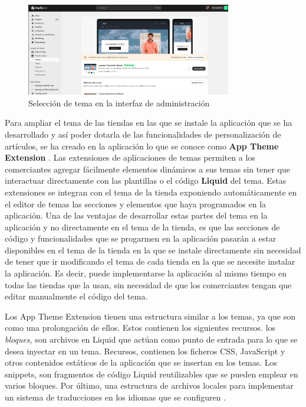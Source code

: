 \documentclass[12pt]{article}
\begin{document}
\begin{figure}[ht]
    \centering
    \includegraphics[width=0.8\textwidth]{imagenes/Interfaz de adminsitración elección de tema.png}
    \caption{\label{fig:2}Selección de tema en la interfaz de administración}
    \vspace{\fill}
\end{figure}

Para ampliar el tema de las tiendas en las que se instale la aplicación que se ha desarrollado y así poder dotarla de las funcionalidades de personalización de 
artículos, se ha creado en la aplicación lo que se conoce como \textbf{App Theme Extension} \cite{theme-app-extension}. Las extensiones de aplicaciones de temas permiten a los comerciantes
agregar fácilmente elementos dinámicos a sus temas sin tener que interactuar directamente con las plantillas o el código \textbf{Liquid} del tema. Estas extensiones
se integran con el tema de la tienda exponiendo automáticamente en el editor de temas las secciones y elementos que haya programados en la aplicación. \cite{shopify-dev}
Una de las ventajas de desarrollar estas partes del tema en la aplicación y no directamente en el tema de la tienda, es que las secciones de código y funcionalidades
que se progarmen en la aplicación pasarán a estar disponibles en el tema de la tienda en la que se instale directamente sin necesidad de tener que ir modificando el tema
de cada tienda en la que se necesite instalar la aplicación. Es decir, puede implementarse la aplicación al mismo tiempo en todas las tiendas que la usan,
sin necesidad de que los comerciantes tengan que editar manualmente el código del tema.

Los App Theme Extension tienen una estructura similar a los temas, ya que son como una prolongación de ellos. Estos contienen los siguientes recursos. 
los \textit{bloques}, son archivos en Liquid que actúan como punto de entrada para lo que se desea inyectar en un tema.
Recursos, contienen los ficheros CSS, JavaScript y otros contenidos estáticos de la aplicación que se insertan en los temas.
Los snippets, son fragmentos de código Liquid reutilizables que se pueden emplear en varios bloques. Por último, una estructura de archivos locales
para implementar un sistema de traducciones en los idiomas que se configuren \cite{shopify-dev}. 
\end{document}
